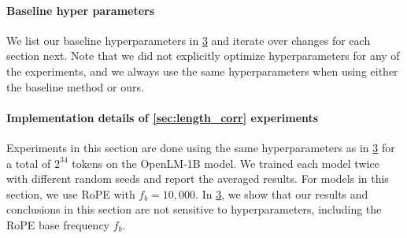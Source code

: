 \begin{figure}[h]
    \begin{minipage}{0.49\textwidth}
         
         \label{tab:openlm1b}
    \end{minipage}
    \hfill
    \begin{minipage}{0.49\textwidth}
         
         \label{tab:openlm3b}
    \end{minipage}
\end{figure}

\begin{figure}[h]
    \begin{minipage}{0.49\textwidth}
         
         \label{tab:openlm7b}
    \end{minipage}
\end{figure}

\paragraph{Baseline hyper parameters}
We list our baseline hyperparameters in \cref{tab:baseline_hp} and iterate over changes for each section next. Note that we did not explicitly optimize hyperparameters for any of the experiments, and we always use the same hyperparameters when using either the baseline method or ours.

\begin{figure}[h]
    \centering
    \begin{minipage}{0.6\textwidth}
         
         \label{tab:baseline_hp}
    \end{minipage}
\end{figure}


\paragraph{Implementation details of \cref{sec:length_corr} experiments}
Experiments in this section are done using the same hyperparameters as in \cref{tab:baseline_hp} for a total of $2^{34}$ tokens on the OpenLM-1B model. We trained each model twice with different random seeds and report the averaged results. For models in this section, we use RoPE with $f_b = 10,000$. In \cref{tab:baseline_hp}, we show that our results and conclusions in this section are not sensitive to hyperparameters, including the RoPE base frequency $f_b$.


